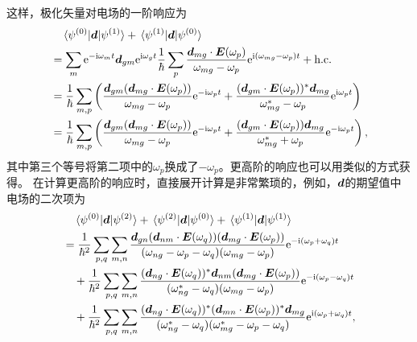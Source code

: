 这样，极化矢量对电场的一阶响应为
\begin{equation}
   \begin{aligned}
    &\quad \mel*{\psi^{(0)}}{\vb*{d}}{\psi^{(1)}} + \mel*{\psi^{(1)}}{\vb*{d}}{\psi^{(0)}} \\
    &= \sum_m \mathrm{e}^{- \mathrm{i} \omega_m t} \vb*{d}_{gm} \mathrm{e}^{\mathrm{i} \omega_g t} \frac{1}{\hbar} \sum_p \frac{\vb*{d}_{mg} \cdot \vb*{E}(\omega_p)}{\omega_{mg} - \omega_p} \mathrm{e}^{\mathrm{i} (\omega_{mg} - \omega_p) t} + \text{h.c.} \\
    &= \frac{1}{\hbar} \sum_{m, p} \left( \frac{ \vb*{d}_{gm} (\vb*{d}_{mg} \cdot \vb*{E}(\omega_p))}{\omega_{mg} - \omega_p} \mathrm{e}^{- \mathrm{i} \omega_p t} + \frac{(\vb*{d}_{gm} \cdot \vb*{E}(\omega_p) )^* \vb*{d}_{mg}}{\omega_{mg}^* - \omega_p} \mathrm{e}^{\mathrm{i} \omega_p t} \right) \\
    &= \frac{1}{\hbar} \sum_{m, p} \left( \frac{ \vb*{d}_{gm} (\vb*{d}_{mg} \cdot \vb*{E}(\omega_p))}{\omega_{mg} - \omega_p} \mathrm{e}^{- \mathrm{i} \omega_p t} + \frac{(\vb*{d}_{gm} \cdot \vb*{E}(\omega_p) ) \vb*{d}_{mg}}{\omega_{mg}^* + \omega_p} \mathrm{e}^{- \mathrm{i} \omega_p t} \right), 
   \end{aligned} 
   \label{eq:dipole-first-perturbation}
\end{equation}
其中第三个等号将第二项中的$\omega_p$换成了$-\omega_p$。更高阶的响应也可以用类似的方式获得。
在计算更高阶的响应时，直接展开计算是非常繁琐的，例如，$\vb*{d}$的期望值中电场的二次项为
\begin{equation}
    \begin{aligned}
        &\quad \mel*{\psi^{(0)}}{\vb*{d}}{\psi^{(2)}} + \mel*{\psi^{(2)}}{\vb*{d}}{\psi^{(0)}} + \mel*{\psi^{(1)}}{\vb*{d}}{\psi^{(1)}} \\
        &= \frac{1}{\hbar^2} \sum_{p, q} \sum_{m, n} \frac{\vb*{d}_{gn} (\vb*{d}_{nm} \cdot \vb*{E}(\omega_q)) (\vb*{d}_{mg} \cdot \vb*{E}(\omega_p))}{(\omega_{ng} - \omega_p - \omega_q) (\omega_{mg} - \omega_p)} \mathrm{e}^{-\mathrm{i} (\omega_p + \omega_q) t} \\
        &\quad + \frac{1}{\hbar^2} \sum_{p, q} \sum_{m, n} \frac{(\vb*{d}_{ng} \cdot \vb*{E}(\omega_q))^* \vb*{d}_{nm} (\vb*{d}_{mg} \cdot \vb*{E}(\omega_p))}{(\omega_{ng}^* - \omega_q) (\omega_{mg} - \omega_p)} \mathrm{e}^{-\mathrm{i} (\omega_p - \omega_q) t} \\
        &\quad + \frac{1}{\hbar^2} \sum_{p, q} \sum_{m, n} \frac{ (\vb*{d}_{ng} \cdot \vb*{E}(\omega_q))^* (\vb*{d}_{mn} \cdot \vb*{E}(\omega_p))^* \vb*{d}_{mg} }{(\omega_{ng}^* - \omega_q) (\omega_{mg}^* - \omega_p - \omega_q)} \mathrm{e}^{\mathrm{i} (\omega_p + \omega_q) t},
    \end{aligned}
\end{equation}
